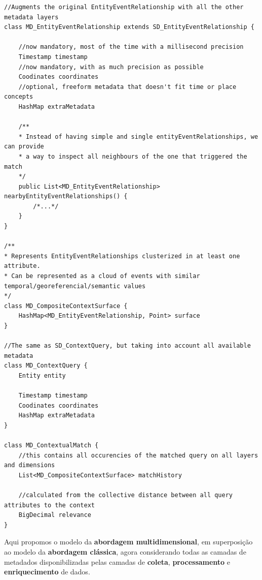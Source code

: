 \begin{verbatim}
//Augments the original EntityEventRelationship with all the other metadata layers
class MD_EntityEventRelationship extends SD_EntityEventRelationship {
    
    //now mandatory, most of the time with a millisecond precision
    Timestamp timestamp
    //now mandatory, with as much precision as possible
    Coodinates coordinates
    //optional, freeform metadata that doesn't fit time or place concepts
    HashMap extraMetadata

    /**
    * Instead of having simple and single entityEventRelationships, we can provide
    * a way to inspect all neighbours of the one that triggered the match
    */
    public List<MD_EntityEventRelationship> nearbyEntityEventRelationships() {
        /*...*/
    }
}

/**
* Represents EntityEventRelationships clusterized in at least one attribute.
* Can be represented as a cloud of events with similar temporal/georeferencial/semantic values
*/
class MD_CompositeContextSurface {
    HashMap<MD_EntityEventRelationship, Point> surface
}

//The same as SD_ContextQuery, but taking into account all available metadata
class MD_ContextQuery {
    Entity entity

    Timestamp timestamp
    Coodinates coordinates
    HashMap extraMetadata
}

class MD_ContextualMatch {
    //this contains all occurencies of the matched query on all layers and dimensions
    List<MD_CompositeContextSurface> matchHistory

    //calculated from the collective distance between all query attributes to the context
    BigDecimal relevance
}
\end{verbatim}

Aqui propomos o modelo da \textbf{abordagem multidimensional}, em superposição ao modelo da \textbf{abordagem clássica}, agora considerando todas as camadas de metadados disponibilizadas pelas camadas de \textbf{coleta}, \textbf{processamento} e \textbf{enriquecimento} de dados.

